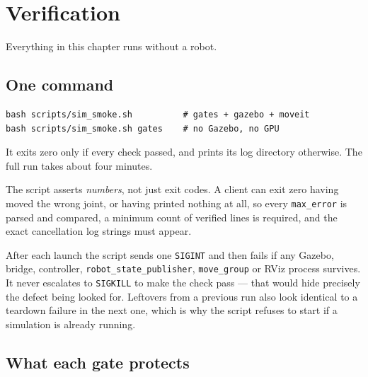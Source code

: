 \chapter{Verification}
\label{ch:verify}

Everything in this chapter runs without a robot.

\section{One command}

\begin{lstlisting}
bash scripts/sim_smoke.sh          # gates + gazebo + moveit
bash scripts/sim_smoke.sh gates    # no Gazebo, no GPU
\end{lstlisting}

It exits zero only if every check passed, and prints its log directory otherwise.
The full run takes about four minutes.

The script asserts \emph{numbers}, not just exit codes. A client can exit zero
having moved the wrong joint, or having printed nothing at all, so every
\texttt{max\_error} is parsed and compared, a minimum count of verified lines is
required, and the exact cancellation log strings must appear.

\begin{notebox}
After each launch the script sends one \texttt{SIGINT} and then fails if any
Gazebo, bridge, controller, \texttt{robot\_state\_publisher}, \texttt{move\_group}
or RViz process survives. It never escalates to \texttt{SIGKILL} to make the check
pass --- that would hide precisely the defect being looked for. Leftovers from a
previous run also look identical to a teardown failure in the next one, which is
why the script refuses to start if a simulation is already running.
\end{notebox}

\section{What each gate protects}

